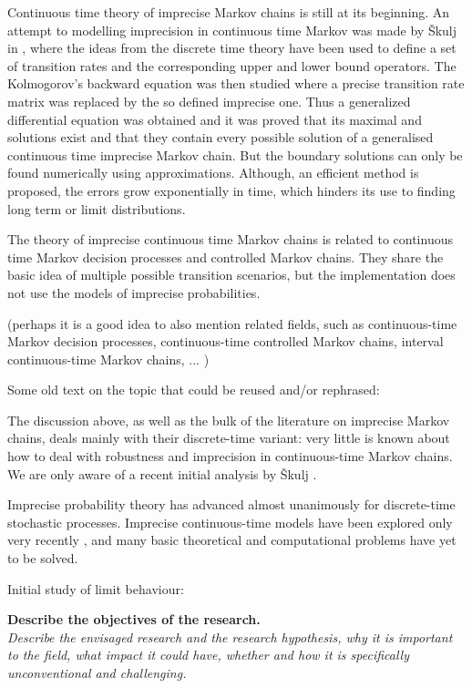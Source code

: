 \documentclass[11pt,dvipsnames,usenames,a4paper]{article}
\begin{document}
Continuous time theory of imprecise Markov chains is still at its beginning. An attempt to modelling imprecision in continuous time Markov was made by Škulj in \cite{skulj2015:continuous:bounds}, where the ideas from the discrete time theory have been used to define a set of transition rates and the corresponding upper and lower bound operators. The Kolmogorov's backward equation was then studied where a precise transition rate matrix was replaced by the so defined imprecise one. Thus a generalized differential equation was obtained and it was proved that its maximal and solutions exist and that they contain every possible solution of a generalised continuous time imprecise Markov chain. But the boundary solutions can only be found numerically using approximations. Although, an efficient method is proposed, the errors grow exponentially in time, which hinders its use to finding long term or limit distributions.

The theory of imprecise continuous time Markov chains is related to continuous time Markov decision processes and controlled Markov chains. They share the basic idea of multiple possible transition scenarios, but the implementation does not use the models of imprecise probabilities. 


(perhaps it is a good idea to also mention related fields, such as continuous-time Markov decision processes, continuous-time controlled Markov chains, interval continuous-time Markov chains, ... )

{\color{Gray}
Some old text on the topic that could be reused and/or rephrased:

The discussion above, as well as the bulk of the literature on imprecise Markov chains, deals mainly with their discrete-time variant: very little is known about how to deal with robustness and imprecision in continuous-time Markov chains. 
We are only aware of a recent initial analysis by \v{S}kulj \cite{skulj2015:continuous:bounds}.

Imprecise probability theory has advanced almost unanimously for discrete-time stochastic processes.
Imprecise continuous-time models have been explored only very recently \cite{skulj2015:continuous:bounds,Troffaes+GSB-ISIPTA15p}, and many basic theoretical and computational problems have yet to be solved.

Initial study of limit behaviour: \cite{DeBock:2016:iCTMClimit}
}

\vspace{3mm}

\textbf{Describe the objectives of the research.}\\
\textit{Describe the envisaged research and the research hypothesis, why it is important to the field, what impact it could have, whether and how it is specifically unconventional and challenging.}
\end{document}
